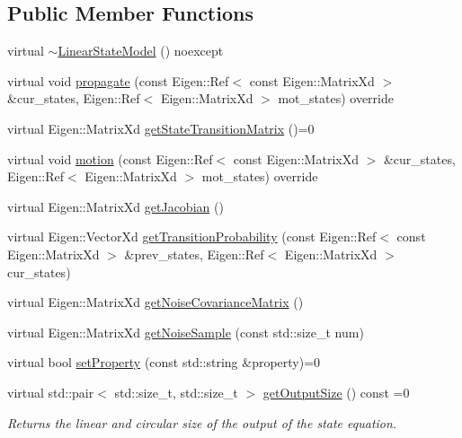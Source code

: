 \subsection*{Public Member Functions}
\begin{DoxyCompactItemize}
\item 
virtual \mbox{\hyperlink{classbfl_1_1LinearStateModel_abe9426efcecc6b1c606f17e0e5101ee0}{$\sim$\+Linear\+State\+Model}} () noexcept
\item 
virtual void \mbox{\hyperlink{classbfl_1_1LinearStateModel_a7823383ddc1ed709b9399c712997f512}{propagate}} (const Eigen\+::\+Ref$<$ const Eigen\+::\+Matrix\+Xd $>$ \&cur\+\_\+states, Eigen\+::\+Ref$<$ Eigen\+::\+Matrix\+Xd $>$ mot\+\_\+states) override
\item 
virtual Eigen\+::\+Matrix\+Xd \mbox{\hyperlink{classbfl_1_1LinearStateModel_a58db2093c6d255b8d41dbf0f0c5c28e5}{get\+State\+Transition\+Matrix}} ()=0
\item 
virtual void \mbox{\hyperlink{classbfl_1_1AdditiveStateModel_a9f145bf8c592fc0092d84421f26dbb8b}{motion}} (const Eigen\+::\+Ref$<$ const Eigen\+::\+Matrix\+Xd $>$ \&cur\+\_\+states, Eigen\+::\+Ref$<$ Eigen\+::\+Matrix\+Xd $>$ mot\+\_\+states) override
\item 
virtual Eigen\+::\+Matrix\+Xd \mbox{\hyperlink{classbfl_1_1StateModel_a78df4b39578345142fcfb18abaab2177}{get\+Jacobian}} ()
\item 
virtual Eigen\+::\+Vector\+Xd \mbox{\hyperlink{classbfl_1_1StateModel_acb582cb7d41ec7b854ed1dbd8965b6fc}{get\+Transition\+Probability}} (const Eigen\+::\+Ref$<$ const Eigen\+::\+Matrix\+Xd $>$ \&prev\+\_\+states, Eigen\+::\+Ref$<$ Eigen\+::\+Matrix\+Xd $>$ cur\+\_\+states)
\item 
virtual Eigen\+::\+Matrix\+Xd \mbox{\hyperlink{classbfl_1_1StateModel_a423c1fa86b9d60c8663dedc6cdcae276}{get\+Noise\+Covariance\+Matrix}} ()
\item 
virtual Eigen\+::\+Matrix\+Xd \mbox{\hyperlink{classbfl_1_1StateModel_acc6733af2dcba2a330bf7c59c3725e42}{get\+Noise\+Sample}} (const std\+::size\+\_\+t num)
\item 
virtual bool \mbox{\hyperlink{classbfl_1_1StateModel_ac86dcdad8f0bbfab39a23e592779feaa}{set\+Property}} (const std\+::string \&property)=0
\item 
virtual std\+::pair$<$ std\+::size\+\_\+t, std\+::size\+\_\+t $>$ \mbox{\hyperlink{classbfl_1_1StateModel_a6bf680b689389d959fc9ac46595e6dab}{get\+Output\+Size}} () const =0
\begin{DoxyCompactList}\small\item\em Returns the linear and circular size of the output of the state equation. \end{DoxyCompactList}\end{DoxyCompactItemize}


